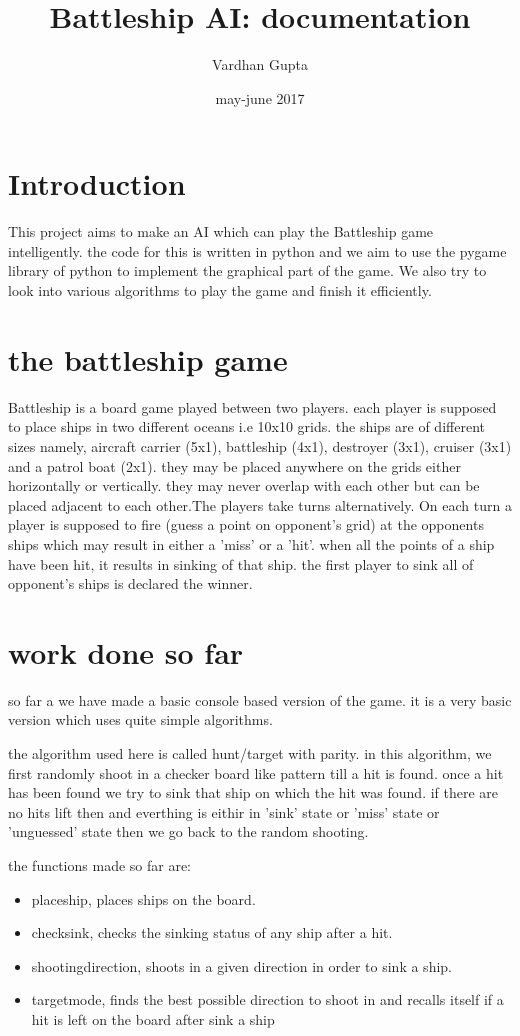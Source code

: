 \documentclass{article}
\title{Battleship AI: documentation}
\author{Vardhan Gupta}
\date{may-june 2017}
\begin{document}
   \maketitle
   \tableofcontents
   \section{Introduction}
   This project aims to make an AI which can play the Battleship game intelligently. the code for this is written in python and we aim to use the pygame library of python to implement the graphical part of the game. We also try to look into various algorithms to play the game and finish it efficiently.
   
   \section{the battleship game}
   Battleship is a board game played between two players. each player is supposed to place ships in two different oceans i.e 10x10 grids. the ships are of different sizes namely, aircraft carrier (5x1), battleship (4x1), destroyer (3x1), cruiser (3x1) and a patrol boat (2x1). they may be placed anywhere on the grids either horizontally or vertically. they may never overlap with each other but can be placed adjacent to each other.The players take turns alternatively. On each turn a player is supposed to fire (guess a point on opponent's grid) at the opponents ships which may result in either a 'miss' or a 'hit'. when all the points of a ship have been hit, it results in sinking of that ship. the first player to sink all of opponent's ships is declared the winner.
   
   \section{work done so far}
   so far a we have made a basic console based version of the game. it is a very basic version which uses quite simple algorithms.
   
   the algorithm used here is called hunt/target with parity. in this algorithm, we first randomly shoot in a checker board like pattern till a hit is found. once a hit has been found we try to sink that ship on which the hit was found. if there are no hits lift then and everthing is eithir in 'sink' state or 'miss' state or 'unguessed' state then we go back to the random shooting.
   
	the functions made so far are:
	\begin{itemize}
   		
   		\item placeship, places ships on the board.
   		\item checksink, checks the sinking status of any ship after a hit.
   		\item shootingdirection, shoots in a given direction in order to sink a ship.
   		\item targetmode, finds the best possible direction to shoot in and recalls itself if a hit is left on the board after sink a ship
	
	\end{itemize}
   
\end{document}

